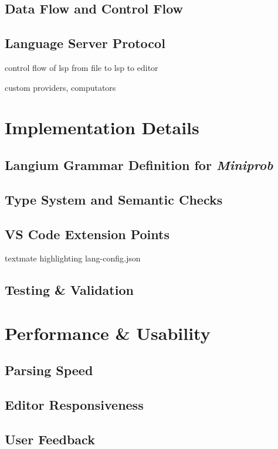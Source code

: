 \section{Data Flow and Control Flow}

\section{Language Server Protocol}
control flow of lsp from file to lsp to editor

custom providers, computators

\chapter{Implementation Details}
\label{sec:langium-grammar}
\section{Langium Grammar Definition for \textit{Miniprob}}
\section{Type System and Semantic Checks}
\section{VS Code Extension Points}
textmate highlighting lang-config.json
\section{Testing \& Validation}

\chapter{Performance \& Usability}
\section{Parsing Speed}
\section{Editor Responsiveness}
\section{User Feedback}